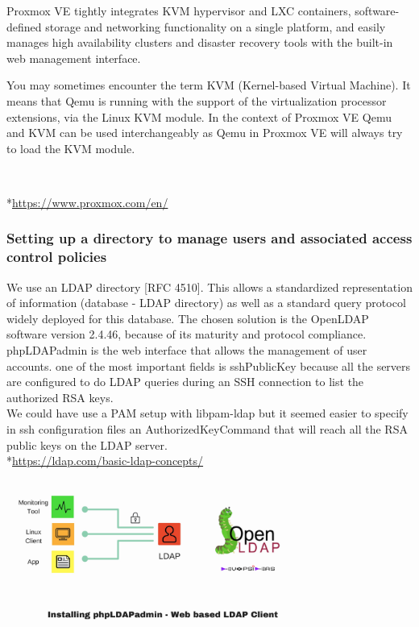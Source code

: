 \vspace{1cm}
Proxmox VE tightly integrates KVM hypervisor and LXC
containers, software-defined storage and networking functionality on a
single platform, and easily manages high availability clusters and
disaster recovery tools with the built-in web management interface.

\vspace{0.5cm}
You may sometimes encounter the term KVM (Kernel-based Virtual Machine).
It means that Qemu is running with the support of the virtualization
processor extensions, via the Linux KVM module. In the context of
Proxmox VE Qemu and KVM can be used interchangeably as Qemu in Proxmox
VE will always try to load the KVM module.

\\
\vspace{1cm}

*\url{https://www.proxmox.com/en/}

\pagebreak

\subsubsection{Setting up a directory to manage users and associated access control policies}

\vspace{0.4cm}

We use an LDAP directory [RFC 4510].
This allows a standardized representation of information (database - LDAP directory) as well as a standard query protocol widely deployed for this database.
The chosen solution is the OpenLDAP software version 2.4.46, because of its
maturity and protocol compliance. phpLDAPadmin is the web interface that
allows the management of user accounts. one of the most important fields is
sshPublicKey because all the servers are configured to do LDAP queries
during an SSH connection to list the authorized RSA keys.
\\ We could have use a PAM setup with libpam-ldap but it seemed easier to specify
in ssh configuration files an AuthorizedKeyCommand that will reach all the
RSA public keys on the LDAP server.
\\ 
*\url{https://ldap.com/basic-ldap-concepts/}

\begin{center}

\includegraphics[width=0.75\textwidth]{images/ldap-example.jpg}

\end{center}

